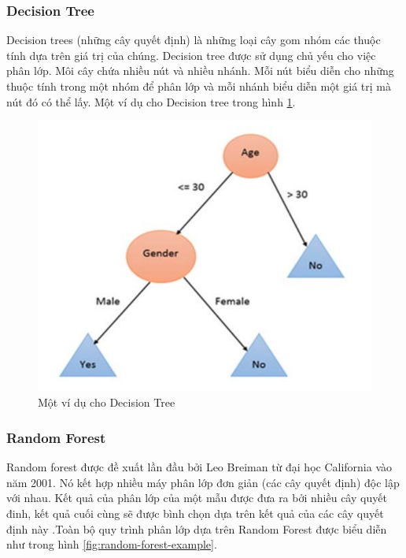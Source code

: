 \subsubsection{Decision Tree}

Decision trees (những cây quyết định) là những loại cây gom nhóm các thuộc tính dựa trên giá trị của chúng. Decision tree được sử dụng chủ yếu cho việc phân lớp. Môi cây chứa nhiều nút và nhiều nhánh. Mỗi nút biểu diễn cho những thuộc tính trong một nhóm để phân lớp và mỗi nhánh biểu diễn một giá trị  mà nút đó có thể lấy. Một ví dụ cho Decision tree trong hình \ref{fig:decision-tree-example}.

\begin{figure}[ht!]
	\centering
	\includegraphics[width=0.6\linewidth]{fig/decision-tree-example.png}
	\caption{Một ví dụ cho Decision Tree}
	\label{fig:decision-tree-example}
\end{figure}

\subsubsection{Random Forest}

Random forest được đề xuất lần đầu bởi Leo Breiman từ đại học California vào năm 2001. Nó kết hợp nhiều máy phân lớp đơn giản (các cây quyết định) độc lập với nhau. Kết quả của phân lớp của một mẫu được đưa ra bởi nhiều cây quyết đinh, kết quả cuối cùng sẽ được bình chọn dựa trên kết quả của các cây quyết định này \cite{70-Parmar}.Toàn bộ quy trình phân lớp dựa trên Random Forest được biểu diễn như trong hình \ref{fig:random-forest-example}.

